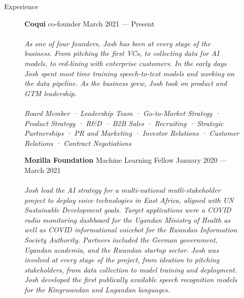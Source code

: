 \documentclass{resume} %
\begin{document}
\begin{rSection}{Experience}

  \begin{figure}[H]
    \begin{minipage}{0.2\textwidth}
      \centering
        
      \end{minipage}
      \begin{minipage}{0.8\textwidth}
          {\bf Coqui} \hfill  co-founder \hfill {} {March 2021 --- Present} \\ \\
          \textit{As one of four founders, Josh has been at every stage of the business. From pitching the first VCs, to collecting data for AI models, to red-lining with enterprise customers. In the early days Josh spent most time training speech-to-text models and working on the data pipeline. As the business grew, Josh took on product and GTM leadership.} \\ \\
          \textit{Board Member · Leadership Team · Go-to-Market Strategy · Product Strategy · R\&D · B2B Sales · Recruiting · Strategic Partnerships · PR and Marketing · Investor Relations · Customer Relations · Contract Negotiations} \\
      \end{minipage}
  \end{figure}

  \begin{figure}[H]
    \begin{minipage}{0.2\textwidth}
      \centering
      
    \end{minipage}
    \begin{minipage}{0.8\textwidth}
      {\bf Mozilla Foundation} \hfill Machine Learning Fellow \hfill {January 2020 --- March 2021} \\ \\
      \textit{Josh lead the AI strategy for a multi-national mutli-stakeholder project to deploy voice technologies in East Africa, aligned with UN Sustainable Development goals. Target applications were a COVID radio monitoring dashboard for the Ugandan Ministry of Health as well as COVID informational voicebot for the Rwandan Information Society Authority. Partners included the German government, Ugandan academia, and the Rwandan startup sector. Josh was involved at every stage of the project, from ideation to pitching stakeholders, from data collection to model training and deployment. Josh developed the first publically available speech recognition models for the Kinyrwandan and Lugandan languages.} \\
    \end{minipage}
  \end{figure}


\end{rSection}
\end{document}
